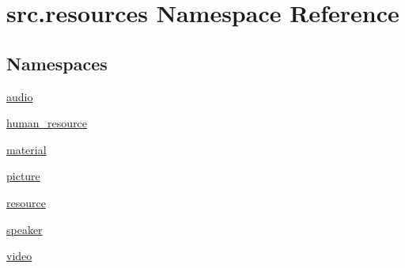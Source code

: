 \hypertarget{namespacesrc_1_1resources}{\section{src.\+resources Namespace Reference}
\label{namespacesrc_1_1resources}
}
\subsection*{Namespaces}
\begin{DoxyCompactItemize}
\item 
 \hyperlink{namespacesrc_1_1resources_1_1audio}{audio}
\item 
 \hyperlink{namespacesrc_1_1resources_1_1human__resource}{human\+\_\+resource}
\item 
 \hyperlink{namespacesrc_1_1resources_1_1material}{material}
\item 
 \hyperlink{namespacesrc_1_1resources_1_1picture}{picture}
\item 
 \hyperlink{namespacesrc_1_1resources_1_1resource}{resource}
\item 
 \hyperlink{namespacesrc_1_1resources_1_1speaker}{speaker}
\item 
 \hyperlink{namespacesrc_1_1resources_1_1video}{video}
\end{DoxyCompactItemize}
